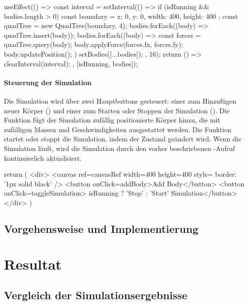\documentclass[a4paper,12pt,twoside]{article}
\begin{document}
\begin{javascript}
useEffect(() => {
    const interval = setInterval(() => {
        if (isRunning && bodies.length > 0) {
            const boundary = { x: 0, y: 0, width: 400, height: 400 };
            const quadTree = new QuadTree(boundary, 4);
            bodies.forEach((body) => quadTree.insert(body));
            bodies.forEach((body) => {
                const forces = quadTree.query(body);
                body.applyForce(forces.fx, forces.fy);
                body.updatePosition();
            })
            setBodies([...bodies]);
        }
    }, 16);
    return () => clearInterval(interval);
}, [isRunning, bodies]);
\end{javascript}


\paragraph{Steuerung der Simulation}
Die Simulation wird über zwei Hauptbuttons gesteuert: einer zum Hinzufügen neuer Körper () und einer zum Starten oder Stoppen der Simulation (). Die Funktion  fügt der Simulation zufällig positionierte Körper hinzu, die mit zufälligen Massen und Geschwindigkeiten ausgestattet werden. Die Funktion  startet oder stoppt die Simulation, indem der Zustand  geändert wird. Wenn die Simulation läuft, wird die Simulation durch den vorher beschriebenen -Aufruf kontinuierlich aktualisiert.
\begin{javascript}
	return (
        <div>
            <canvas ref={canvasRef} width={400} height={400} style={{ border: '1px solid black' }} />
            <button onClick={addBody}>Add Body</button>
            <button onClick={toggleSimulation}> {isRunning ? 'Stop' : 'Start'} Simulation</button>
        </div>
    )
\end{javascript}

\subsection{Vorgehensweise und Implementierung}

\section{Resultat}
\subsection{Vergleich der Simulationsergebnisse}
\end{document}
